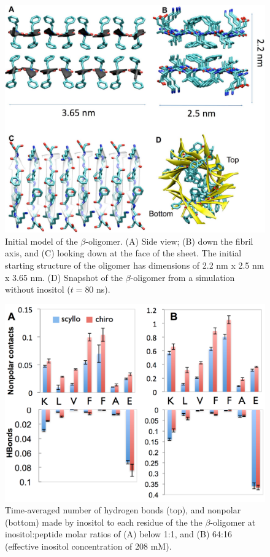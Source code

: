 \begin{figure}[ht]
\centering
\includegraphics[width=15.15cm]{figures/appendixA/inos2_figures_SI_betaInitialModel.pdf}
\caption[Initial model of the $\beta$-oligomer]{Initial model of the $\beta$-oligomer. (A) Side view; (B) down the fibril axis, and (C) looking down at the face of the sheet. The initial starting structure of the oligomer has dimensions of 2.2 nm x 2.5 nm x 3.65 nm. (D) Snapshot of the $\beta$-oligomer from a simulation without inositol ($t=80$ ns).}
\label{fig:SI-betaInitialModel}
\end{figure}

\begin{figure}[ht]
\centering
\includegraphics[width=15.15cm]{figures/appendixA/inos2_figures_SI_betaBinding.pdf}
\caption{Time-averaged number of hydrogen bonds (top), and nonpolar (bottom) made by inositol to each residue of the  the $\beta$-oligomer at inositol:peptide molar ratios of (A) below 1:1, and (B) 64:16 (effective inositol concentration of 208 mM).}
\label{fig:SI-betaBinding}
\end{figure}